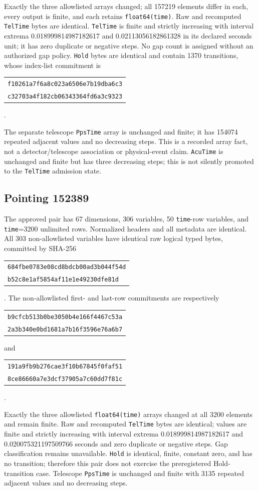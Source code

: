 \documentclass[11pt]{article}
\newcommand{\code}[1]{\texttt{#1}}
\begin{document}
Exactly the three allowlisted arrays changed; all 157219 elements differ in
each, every output is finite, and each retains \code{float64(time)}.  Raw and
recomputed \code{TelTime} bytes are identical.  \code{TelTime} is finite and
strictly increasing with interval extrema 0.018999814987182617 and
0.02113056182861328 in its declared seconds unit; it has zero duplicate or
negative steps.  No gap count is assigned without an authorized gap policy.
\code{Hold} bytes are identical and contain 1370 transitions, whose index-list
commitment is
\begin{tabular}[t]{@{}l@{}}
\code{f10261a7f6a8c023a6506e7b19dba6c3}\\
\code{c32703a4f182cb06343364fd6a3c9323}
\end{tabular}.

The separate telescope \code{PpsTime} array is unchanged and finite; it has
154074 repeated adjacent values and no decreasing steps.  This is a recorded
array fact, not a detector/telescope association or physical-event claim.
\code{AcuTime} is unchanged and finite but has three decreasing steps; this is
not silently promoted to the \code{TelTime} admission state.

\subsection{Pointing 152389}

The approved pair has 67 dimensions, 306 variables, 50 \code{time}-row
variables, and \code{time}=3200 unlimited rows.  Normalized headers and all
metadata are identical.  All 303 non-allowlisted variables have identical raw
logical typed bytes, committed by SHA-256
\begin{tabular}[t]{@{}l@{}}
\code{684fbe0783e08cd8bdcb00ad3b044f54d}\\
\code{b52c8e1af5854af11e1e49230dfe81d}
\end{tabular}.
The non-allowlisted first- and last-row commitments are respectively
\begin{tabular}[t]{@{}l@{}}
\code{b9cfcb513b0be3050b4e166f4467c53a}\\
\code{2a3b340e0bd1681a7b16f3596e76a6b7}
\end{tabular}
and
\begin{tabular}[t]{@{}l@{}}
\code{191a9fb9b276cae3f10b67845f0faf51}\\
\code{8ce86660a7e3dcf37905a7c60dd7f81c}
\end{tabular}.

Exactly the three allowlisted \code{float64(time)} arrays changed at all 3200
elements and remain finite.  Raw and recomputed \code{TelTime} bytes are
identical; values are finite and strictly increasing with interval extrema
0.018999814987182617 and 0.020075321197509766 seconds and zero duplicate or
negative steps.  Gap classification remains unavailable.  \code{Hold} is
identical, finite, constant zero, and has no transition; therefore this pair
does not exercise the preregistered Hold-transition case.  Telescope
\code{PpsTime} is unchanged and finite with 3135 repeated adjacent values and
no decreasing steps.
\end{document}
